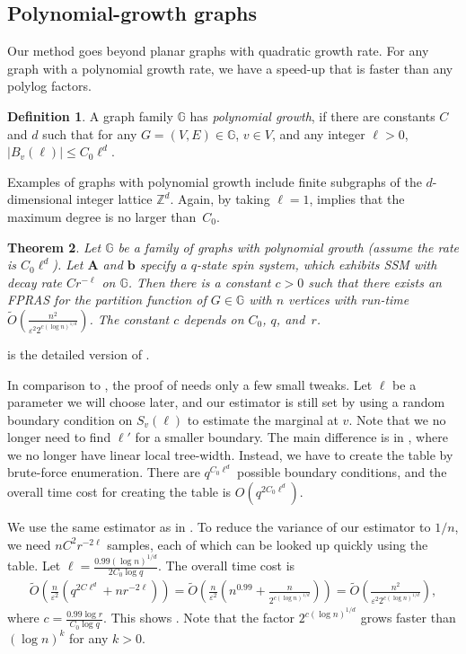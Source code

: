 \documentclass[11pt,a4paper]{amsart}
\def\=#1{\mathbb{#1}}
\newcommand{\abs}[1]{\ensuremath{\left\vert#1\right\vert}}
\newcommand{\eps}{\varepsilon}
\newtheorem{theorem}{Theorem}
\theoremstyle{definition}
\newtheorem{definition}[theorem]{Definition}
\theoremstyle{remark}
\begin{document}
\subsection{Polynomial-growth graphs} \label{sec:poly-growth}

Our method goes beyond planar graphs with quadratic growth rate.
For any graph with a polynomial growth rate, we have a speed-up that is faster than any polylog factors.

\begin{definition}  \label{def:poly-growth}
  A graph family $\=G$ has \emph{polynomial growth},
  if there are constants $C$ and $d$ such that for any $G=(V,E)\in\=G$, $v\in V$, and any integer $\ell>0$,
  $\abs{B_v(\ell)}\le C_0\ell^d$.
\end{definition}

Examples of graphs with polynomial growth include finite subgraphs of the $d$-dimensional integer lattice $\=Z^d$.
Again, by taking $\ell=1$,  implies that the maximum degree is no larger than~$C_0$.

\begin{theorem} \label{thm:polylog}
  Let $\=G$ be a family of graphs with polynomial growth (assume the rate is $C_0\ell^d$).
  Let ${\bm A}$ and ${\bm b}$ specify a $q$-state spin system, which exhibits SSM with decay rate $Cr^{-\ell}$ on $\=G$.
  Then there is a constant $c>0$ such that there exists an FPRAS for the partition function of $G\in\=G$ with $n$ vertices with run-time $\widetilde{O}\left(\frac{n^2}{\eps^2 2^{c(\log n)^{1/d}}}\right)$.
  The constant $c$ depends on $C_0$, $q$, and~$r$.
\end{theorem}

 is the detailed version of .

In comparison to ,
the proof of  needs only a few small tweaks.
Let $\ell$ be a parameter we will choose later,
and our estimator is still set by using a random boundary condition on $S_v(\ell)$ to estimate the marginal at $v$.
Note that we no longer need to find $\ell'$ for a smaller boundary.
The main difference is in ,
where we no longer have linear local tree-width.
Instead, we have to create the table by brute-force enumeration.
There are $q^{C_0\ell^d}$ possible boundary conditions,
and the overall time cost for creating the table is $O(q^{2C_0\ell^d})$.

We use the same estimator as in .
To reduce the variance of our estimator to $1/n$, we need $nC^2r^{-2\ell}$ samples,
each of which can be looked up quickly using the table.
Let $\ell=\frac{0.99(\log n)^{1/d}}{2C_0\log q}$.
The overall time cost is
\begin{align*}
  \widetilde{O}\left( \frac{n}{\eps^2}\left( q^{2C\ell^d}+ nr^{-2\ell}\right) \right)
  =\widetilde{O}\left( \frac{n}{\eps^2}\left(n^{0.99}+\frac{n}{2^{c(\log n)^{1/d}}}\right) \right)
  =\widetilde{O}\left(\frac{n^2}{\eps^2 2^{c(\log n)^{1/d}}}\right),
\end{align*}
where $c=\frac{0.99\log r}{C_0\log q}$.
This shows .
Note that the factor $2^{c(\log n)^{1/d}}$ grows faster than $(\log n)^k$ for any $k>0$.
\end{document}
